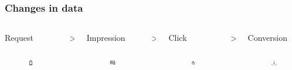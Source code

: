 \documentclass[intlimits, 9pt, unicode]{beamer}
\begin{document}
\begin{frame}
    \frametitle{Changes in data}
    
       \begin{columns}
    \begin{column}{0.25\textwidth}
    \centering
     Request
     \begin{figure}
	\includegraphics[height=1cm]{images/scheme_request}
     \end{figure}
     \end{column}
    \begin{column}{0.001\textwidth}
    \centering
	>
     \end{column}
    \begin{column}{0.25\textwidth}
    \centering
    Impression
     \begin{figure}
	\includegraphics[height=1cm]{images/scheme_impression}
     \end{figure}
    \end{column}
    \begin{column}{0.001\textwidth}
    \centering
    >
    \end{column}
    \begin{column}{0.25\textwidth}
    \centering
    Click
     \begin{figure}
	\includegraphics[height=1cm]{images/scheme_click}
     \end{figure}
    \end{column}
    \begin{column}{0.001\textwidth}
    \centering
    >
    \end{column}
    \begin{column}{0.25\textwidth}
    \centering
     Conversion
     \begin{figure}
	\includegraphics[height=1cm]{images/scheme_conversion}
     \end{figure}
     \end{column}
     \end{columns}
     

\end{frame}
\end{document}
